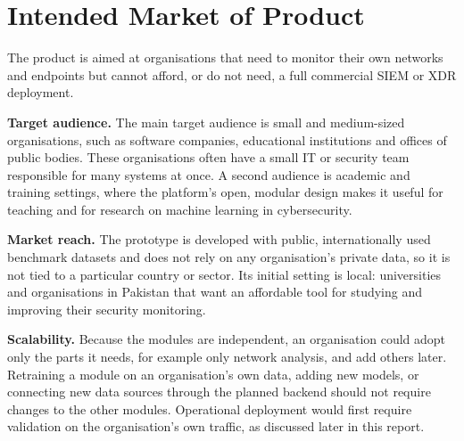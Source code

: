 \section{Intended Market of Product}

The product is aimed at organisations that need to monitor their own networks and endpoints but cannot afford, or do not need, a full commercial SIEM or XDR deployment.

\textbf{Target audience.} The main target audience is small and medium-sized organisations, such as software companies, educational institutions and offices of public bodies. These organisations often have a small IT or security team responsible for many systems at once. A second audience is academic and training settings, where the platform's open, modular design makes it useful for teaching and for research on machine learning in cybersecurity.

\textbf{Market reach.} The prototype is developed with public, internationally used benchmark datasets and does not rely on any organisation's private data, so it is not tied to a particular country or sector. Its initial setting is local: universities and organisations in Pakistan that want an affordable tool for studying and improving their security monitoring.

\textbf{Scalability.} Because the modules are independent, an organisation could adopt only the parts it needs, for example only network analysis, and add others later. Retraining a module on an organisation's own data, adding new models, or connecting new data sources through the planned backend should not require changes to the other modules. Operational deployment would first require validation on the organisation's own traffic, as discussed later in this report.
